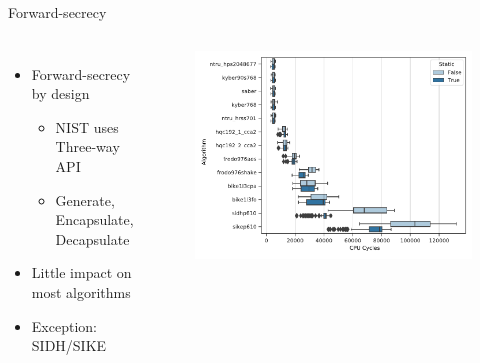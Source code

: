 \documentclass[fleqn,compress,utf8,aspectratio=169,t]{beamer}
\begin{document}
\begin{frame}{Forward-secrecy}
  \begin{columns}[T]
      \begin{itemize}
        \item Forward-secrecy by design
        \begin{itemize}
          \item NIST uses Three-way API
          \item Generate, Encapsulate, Decapsulate
        \end{itemize}
        \item Little impact on most algorithms
        \item Exception: SIDH/SIKE
      \end{itemize}
      \vspace*{-0.5cm}
      \begin{figure}[t]
        \centering\includegraphics[trim={-10px 0 0 0}, clip, width=1\columnwidth]{plot_box_static.pdf}
      \end{figure}
    \end{columns}
\end{frame}
\end{document}
